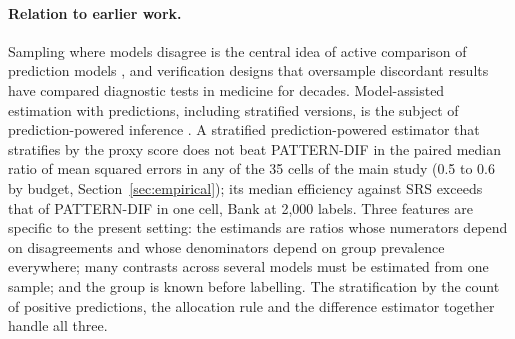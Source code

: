 \paragraph{Relation to earlier work.} Sampling where models disagree is the central idea of active comparison of prediction models \citep{sawade2012active}, and verification designs that oversample discordant results have compared diagnostic tests in medicine for decades. Model-assisted estimation with predictions, including stratified versions, is the subject of prediction-powered inference \citep{angelopoulos2023ppi,fisch2024stratppi}. A stratified prediction-powered estimator that stratifies by the proxy score does not beat PATTERN-DIF in the paired median ratio of mean squared errors in any of the 35 cells of the main study (0.5 to 0.6 by budget, Section~\ref{sec:empirical}); its median efficiency against SRS exceeds that of PATTERN-DIF in one cell, Bank at 2,000 labels. Three features are specific to the present setting: the estimands are ratios whose numerators depend on disagreements and whose denominators depend on group prevalence everywhere; many contrasts across several models must be estimated from one sample; and the group is known before labelling. The stratification by the count of positive predictions, the allocation rule and the difference estimator together handle all three.

